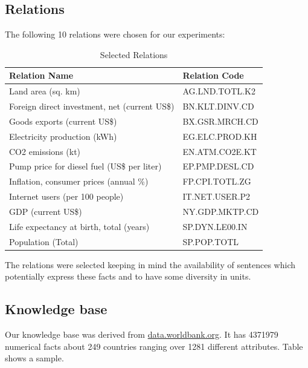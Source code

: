 \documentclass[a4paper,10pt]{article}
\begin{document}
\subsection{Relations}
The following 10 relations were chosen for our experiments:
 \begin{center}
 \begin{table}[H]
\begin{tabular}{|l|l|}
\hline
Relation Name & Relation Code \\
\hline
Land area (sq. km)&AG.LND.TOTL.K2\\
Foreign direct investment, net (current US\$)&BN.KLT.DINV.CD\\
Goods exports (current US\$)&BX.GSR.MRCH.CD\\
Electricity production (kWh)&EG.ELC.PROD.KH\\
CO2 emissions (kt)&EN.ATM.CO2E.KT\\
Pump price for diesel fuel (US\$ per liter)&EP.PMP.DESL.CD\\
Inflation, consumer prices (annual \%)&FP.CPI.TOTL.ZG\\
Internet users (per 100 people)&IT.NET.USER.P2\\
GDP (current US\$)&NY.GDP.MKTP.CD\\
Life expectancy at birth, total (years)&SP.DYN.LE00.IN\\
Population (Total)&SP.POP.TOTL\\
\hline
\end{tabular}
\caption{Selected Relations}
\label{rels}
\end{table}
\end{center}

The relations were selected keeping in mind the availability of sentences which potentially express these facts
and to have some diversity in units.

\subsection{Knowledge base}
Our knowledge base was derived from \url{data.worldbank.org}.
It has 4371979 numerical facts about 249 countries ranging over 1281 different attributes. 
Table \cite{fig:kb} shows a sample.
\end{document}
